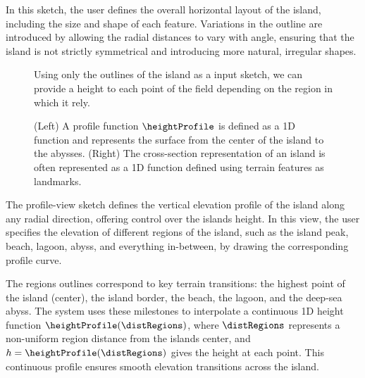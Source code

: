In this sketch, the user defines the overall horizontal layout of the island, including the size and shape of each feature. Variations in the outline are introduced by allowing the radial distances to vary with angle, ensuring that the island is not strictly symmetrical and introducing more natural, irregular shapes.

\begin{figure}[H]
    \caption{Using only the outlines of the island as a input sketch, we can provide a height to each point of the field depending on the region in which it rely.}
    \label{fig:coral-island-procedural-height-only}
\end{figure}


\begin{figure}[H]
	\centering
    \caption{(Left) A profile function $\heightProfile$ is defined as a 1D function and represents the surface from the center of the island to the abysses. (Right) The cross-section representation of an island is often represented as a 1D function defined using terrain features as landmarks. }
    \label{fig:coral-island-profile-function}
\end{figure}

The profile-view sketch defines the vertical elevation profile of the island along any radial direction, offering control over the islands height. In this view, the user specifies the elevation of different regions of the island, such as the island peak, beach, lagoon, abyss, and everything in-between, by drawing the corresponding profile curve.

The regions outlines correspond to key terrain transitions: the highest point of the island (center), the island border, the beach, the lagoon, and the deep-sea abyss. The system uses these milestones to interpolate a continuous 1D height function $\heightProfile(\distRegions)$, where $\distRegions$ represents a non-uniform region distance from the islands center, and $h = \heightProfile(\distRegions)$ gives the height at each point. This continuous profile ensures smooth elevation transitions across the island.

